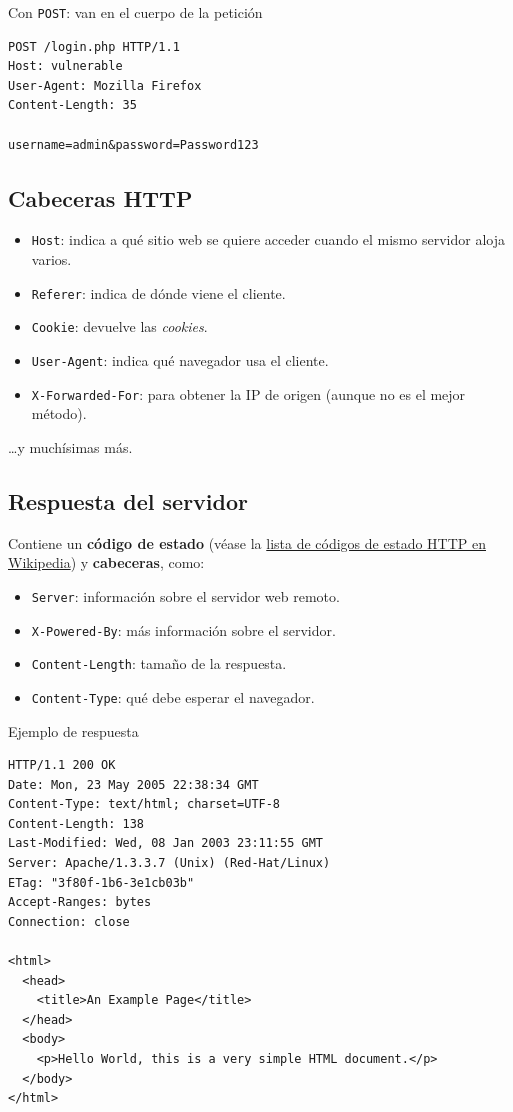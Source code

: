 \documentclass[11pt,a4paper]{report}
\begin{document}
\begin{ejemplo}{Con \texttt{POST}: van en el cuerpo de la petición}
\begin{verbatim}
POST /login.php HTTP/1.1
Host: vulnerable
User-Agent: Mozilla Firefox
Content-Length: 35
 
username=admin&password=Password123
\end{verbatim}
\end{ejemplo}
 
\subsection{Cabeceras HTTP}
 
\begin{itemize}
  \item \texttt{Host}: indica a qué sitio web se quiere acceder cuando el mismo servidor aloja varios.
  \item \texttt{Referer}: indica de dónde viene el cliente.
  \item \texttt{Cookie}: devuelve las \emph{cookies}.
  \item \texttt{User-Agent}: indica qué navegador usa el cliente.
  \item \texttt{X-Forwarded-For}: para obtener la IP de origen (aunque no es el mejor método).
\end{itemize}
\ldots y muchísimas más.
 
\subsection{Respuesta del servidor}
 
Contiene un \textbf{código de estado} (véase la \href{https://en.wikipedia.org/wiki/List_of_HTTP_status_codes}{lista de códigos de estado HTTP en Wikipedia}) y \textbf{cabeceras}, como:
\begin{itemize}
  \item \texttt{Server}: información sobre el servidor web remoto.
  \item \texttt{X-Powered-By}: más información sobre el servidor.
  \item \texttt{Content-Length}: tamaño de la respuesta.
  \item \texttt{Content-Type}: qué debe esperar el navegador.
\end{itemize}
 
\begin{ejemplo}{Ejemplo de respuesta}
\begin{verbatim}
HTTP/1.1 200 OK
Date: Mon, 23 May 2005 22:38:34 GMT
Content-Type: text/html; charset=UTF-8
Content-Length: 138
Last-Modified: Wed, 08 Jan 2003 23:11:55 GMT
Server: Apache/1.3.3.7 (Unix) (Red-Hat/Linux)
ETag: "3f80f-1b6-3e1cb03b"
Accept-Ranges: bytes
Connection: close
 
<html>
  <head>
    <title>An Example Page</title>
  </head>
  <body>
    <p>Hello World, this is a very simple HTML document.</p>
  </body>
</html>
\end{verbatim}
\end{ejemplo}
 
\end{document}
